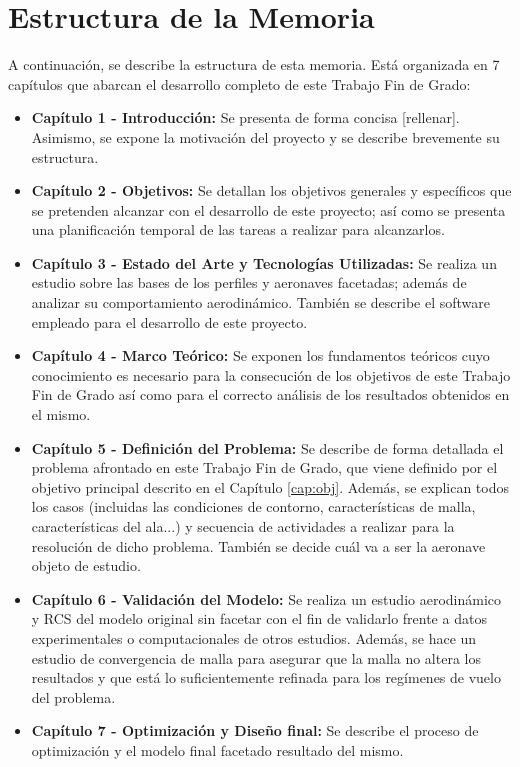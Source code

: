 \section{Estructura de la Memoria}
\label{sec:estr}

A continuación, se describe la estructura de esta memoria. Está organizada en 7 capítulos que abarcan el desarrollo completo de este Trabajo Fin de Grado:

\begin{itemize}
    \item \textbf{Capítulo 1 - Introducción:} Se presenta de forma concisa [rellenar]. Asimismo, se expone la motivación del proyecto y se describe brevemente su estructura.
    \item \textbf{Capítulo 2 - Objetivos:} Se detallan los objetivos generales y específicos que se pretenden alcanzar con el desarrollo de este proyecto; así como se presenta una planificación temporal de las tareas a realizar para alcanzarlos.
    \item \textbf{Capítulo 3 - Estado del Arte y Tecnologías Utilizadas:} Se realiza un estudio sobre las bases de los perfiles y aeronaves facetadas; además de analizar su comportamiento aerodinámico. También se describe el software empleado para el desarrollo de este proyecto.
    \item \textbf{Capítulo 4 - Marco Teórico:} Se exponen los fundamentos teóricos cuyo conocimiento es necesario para la consecución de los objetivos de este Trabajo Fin de Grado así como para el correcto análisis de los resultados obtenidos en el mismo.
    \item \textbf{Capítulo 5 - Definición del Problema:} Se describe de forma detallada el problema afrontado en este Trabajo Fin de Grado, que viene definido por el objetivo principal descrito en el Capítulo \ref{cap:obj}. Además, se explican todos los casos (incluidas las condiciones de contorno, características de malla, características del ala...) y secuencia de actividades a realizar para la resolución de dicho problema. También se decide cuál va a ser la aeronave objeto de estudio.
    \item \textbf{Capítulo 6 - Validación del Modelo:} Se realiza un estudio aerodinámico y RCS del modelo original sin facetar con el fin de validarlo frente a datos experimentales o computacionales de otros estudios. Además, se hace un estudio de convergencia de malla para asegurar que la malla no altera los resultados y que está lo suficientemente refinada para los regímenes de vuelo del problema.
    \item \textbf{Capítulo 7 - Optimización y Diseño final:} Se describe el proceso de optimización y el modelo final facetado resultado del mismo.

\end{itemize}
